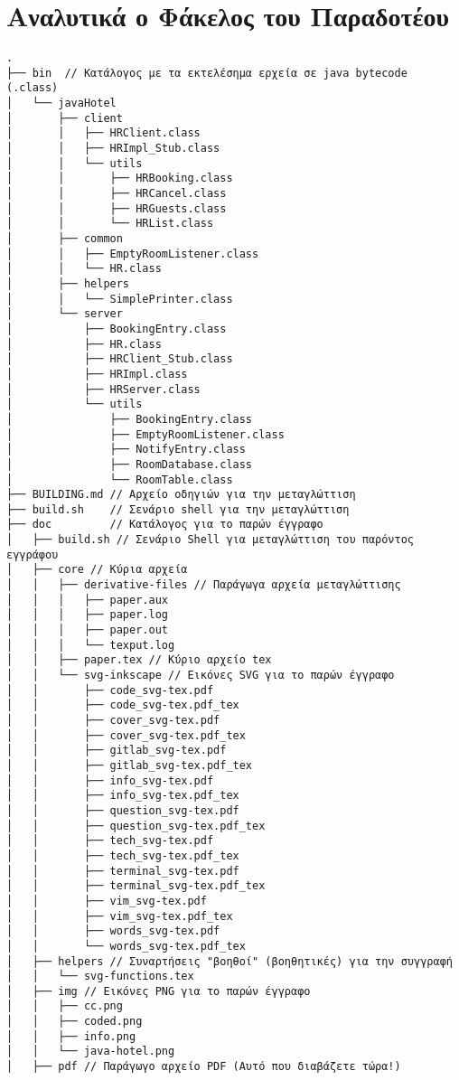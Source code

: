\section{Αναλυτικά ο Φάκελος του Παραδοτέου}
\small{
\begin{verbatim}
.
├── bin  // Κατάλογος με τα εκτελέσημα ερχεία σε java bytecode (.class)
│   └── javaHotel
│       ├── client
│       │   ├── HRClient.class
│       │   ├── HRImpl_Stub.class
│       │   └── utils
│       │       ├── HRBooking.class
│       │       ├── HRCancel.class
│       │       ├── HRGuests.class
│       │       └── HRList.class
│       ├── common
│       │   ├── EmptyRoomListener.class
│       │   └── HR.class
│       ├── helpers
│       │   └── SimplePrinter.class
│       └── server
│           ├── BookingEntry.class
│           ├── HR.class
│           ├── HRClient_Stub.class
│           ├── HRImpl.class
│           ├── HRServer.class
│           └── utils
│               ├── BookingEntry.class
│               ├── EmptyRoomListener.class
│               ├── NotifyEntry.class
│               ├── RoomDatabase.class
│               └── RoomTable.class
├── BUILDING.md // Αρχείο οδηγιών για την μεταγλώττιση
├── build.sh    // Σενάριο shell για την μεταγλώττιση
├── doc         // Κατάλογος για το παρών έγγραφο
│   ├── build.sh // Σενάριο Shell για μεταγλώττιση του παρόντος εγγράφου
│   ├── core // Κύρια αρχεία
│   │   ├── derivative-files // Παράγωγα αρχεία μεταγλώττισης
│   │   │   ├── paper.aux
│   │   │   ├── paper.log
│   │   │   ├── paper.out
│   │   │   └── texput.log
│   │   ├── paper.tex // Κύριο αρχείο tex
│   │   └── svg-inkscape // Εικόνες SVG για το παρών έγγραφο
│   │       ├── code_svg-tex.pdf
│   │       ├── code_svg-tex.pdf_tex
│   │       ├── cover_svg-tex.pdf
│   │       ├── cover_svg-tex.pdf_tex
│   │       ├── gitlab_svg-tex.pdf
│   │       ├── gitlab_svg-tex.pdf_tex
│   │       ├── info_svg-tex.pdf
│   │       ├── info_svg-tex.pdf_tex
│   │       ├── question_svg-tex.pdf
│   │       ├── question_svg-tex.pdf_tex
│   │       ├── tech_svg-tex.pdf
│   │       ├── tech_svg-tex.pdf_tex
│   │       ├── terminal_svg-tex.pdf
│   │       ├── terminal_svg-tex.pdf_tex
│   │       ├── vim_svg-tex.pdf
│   │       ├── vim_svg-tex.pdf_tex
│   │       ├── words_svg-tex.pdf
│   │       └── words_svg-tex.pdf_tex
│   ├── helpers // Συναρτήσεις "βοηθοί" (βοηθητικές) για την συγγραφή
│   │   └── svg-functions.tex
│   ├── img // Εικόνες PNG για το παρών έγγραφο
│   │   ├── cc.png
│   │   ├── coded.png
│   │   ├── info.png
│   │   └── java-hotel.png
│   ├── pdf // Παράγωγο αρχείο PDF (Αυτό που διαβάζετε τώρα!)

\end{verbatim}}
